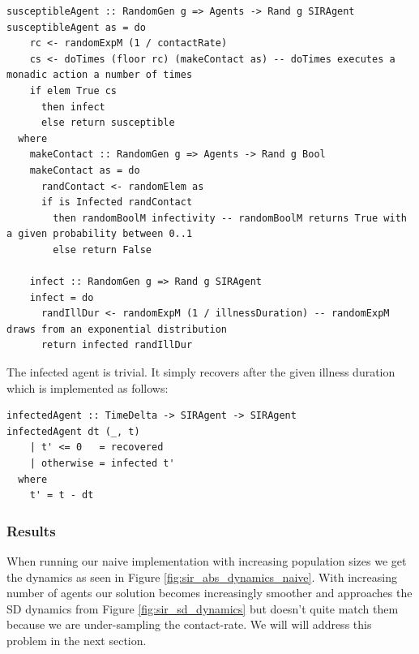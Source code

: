 \begin{verbatim}
susceptibleAgent :: RandomGen g => Agents -> Rand g SIRAgent
susceptibleAgent as = do
    rc <- randomExpM (1 / contactRate)
    cs <- doTimes (floor rc) (makeContact as) -- doTimes executes a monadic action a number of times
    if elem True cs
      then infect
      else return susceptible
  where
    makeContact :: RandomGen g => Agents -> Rand g Bool
    makeContact as = do
      randContact <- randomElem as
      if is Infected randContact
        then randomBoolM infectivity -- randomBoolM returns True with a given probability between 0..1
        else return False

    infect :: RandomGen g => Rand g SIRAgent
    infect = do
      randIllDur <- randomExpM (1 / illnessDuration) -- randomExpM draws from an exponential distribution
      return infected randIllDur
\end{verbatim}

The infected agent is trivial. It simply recovers after the given illness duration which is implemented as follows:

\begin{verbatim}
infectedAgent :: TimeDelta -> SIRAgent -> SIRAgent
infectedAgent dt (_, t) 
    | t' <= 0   = recovered
    | otherwise = infected t'
  where
    t' = t - dt  
\end{verbatim}

\subsubsection{Results}
When running our naive implementation with increasing population sizes we get the dynamics as seen in Figure \ref{fig:sir_abs_dynamics_naive}. With increasing number of agents \cite{macal_agent-based_2010} our solution becomes increasingly smoother and approaches the SD dynamics from Figure \ref{fig:sir_sd_dynamics}  but doesn't quite match them because we are under-sampling the contact-rate. We will will address this problem in the next section.

